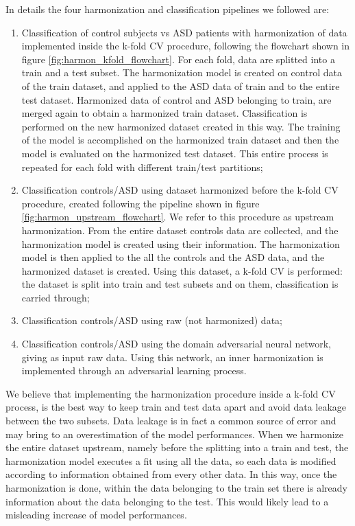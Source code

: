 \documentclass[11pt]{report}
\begin{document}
In details the four harmonization and classification pipelines we followed are:
\begin{enumerate}
\item Classification of control subjects vs ASD patients with harmonization of data implemented inside the k-fold CV procedure, following the flowchart shown in figure \ref{fig:harmon_kfold_flowchart}. 
For each fold, data are splitted into a train and a test subset. 
The harmonization model is created on control data of the train dataset, and applied to the ASD data of train and to the entire test dataset. 
Harmonized data of control and ASD belonging to train, are merged again to obtain a harmonized train dataset. 
Classification is performed on the new harmonized dataset created in this way. The training of the model is accomplished on the harmonized train dataset and then the model is evaluated on the harmonized test dataset. 
This entire process is repeated for each fold with different train/test partitions;

\item Classification controls/ASD using dataset harmonized before the k-fold CV procedure, created following the pipeline shown in figure \ref{fig:harmon_upstream_flowchart}. We refer to this procedure as upstream harmonization.
From the entire dataset controls data are collected, and the harmonization model is created using their information. 
The harmonization model is then applied to the all the controls and the ASD data, and the harmonized dataset is created. 
Using this dataset, a k-fold CV is performed: the dataset is split into train and test subsets and on them, classification is carried through;
\item Classification controls/ASD using raw (not harmonized) data;
\item Classification controls/ASD using the domain adversarial neural network, giving as input raw data. Using this network, an inner harmonization is implemented through an adversarial learning process.
\end{enumerate}


We believe that implementing the harmonization procedure inside a k-fold CV process, is the best way to keep train and test data apart and avoid data leakage between the two subsets.
Data leakage is in fact a common source of error and may bring to an overestimation of the model performances.
When we harmonize the entire dataset upstream, namely before the splitting into a train and test, the harmonization model executes a fit using all the data, so each data is modified according to information obtained from every other data.
In this way, once the harmonization is done, within the data belonging to the train set there is already information about the data belonging to the test. 
This would likely lead to a misleading increase of model performances.
\end{document}
